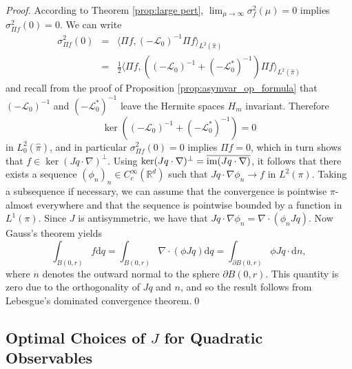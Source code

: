 \begin{proof}
	According to Theorem \ref{prop:large pert},  $\lim_{\mu\rightarrow\infty}\sigma_{f}^{2}(\mu)=0$  implies $\sigma_{\Pi f}^{2}(0)=0$. We can write 
	\begin{subequations}
	\begin{eqnarray}
	\sigma_{\Pi f}^{2}(0) & = & \langle \Pi f, (-\mathcal{L}_0)^{-1}\Pi f \rangle_{ L^{2}(\widehat{\pi})} \nonumber \\
	& = & \frac{1}{2}\langle \Pi f, \left((-\mathcal{L}_0)^{-1}+(-\mathcal{L}^{*}_0)^{-1}\right)\Pi f \rangle_{ L^{2}(\widehat{\pi})} \nonumber
	\end{eqnarray}
	\end{subequations}
	and recall from the proof of Proposition \ref{prop:asymvar_op_formula} that $(-\mathcal{L}_0)^{-1}$ and $(-\mathcal{L}^{*}_0)^{-1}$ leave the Hermite spaces $H_m$ invariant. Therefore  
	\begin{equation}
	\ker \left((-\mathcal{L}_0)^{-1}+(-\mathcal{L}^{*}_0)^{-1}\right) = {0}
	\end{equation}
	in $L^2_0(\widehat{\pi})$, and in particular $\sigma_{\Pi f}^{2}(0)=0$ implies $\Pi f = 0$, which in turn shows that
	  $f\in\ker(Jq\cdot\nabla)^{\perp}$. Using $\ker(Jq\cdot\nabla)^{\perp}=\overline{\operatorname{im}(Jq\cdot\nabla)}$,
	it follows that there exists a sequence $(\phi_n)_n\in C_c^{\infty}(\mathbb{R}^d)$ such that $Jq\cdot\nabla\phi_n \rightarrow f$ in $L^2(\pi)$. Taking a subsequence if necessary, we can assume that the convergence is pointwise $\pi$-almost everywhere and that the sequence is pointwise bounded by a function in $L^1(\pi)$. 
	Since $J$ is antisymmetric, we have that $Jq\cdot\nabla\phi_n=\nabla\cdot(\phi_n Jq)$.
	Now Gauss's theorem yields
	\[
	\int_{B(0,r)}f\mathrm{d}q=\int_{B(0,r)}\nabla\cdot(\phi Jq)\mathrm{d}q=\int_{\partial B(0,r)}\phi Jq\cdot\mathrm{d}n,
	\]
	where $n$ denotes
	the outward normal to the sphere $\partial B(0,r)$. This quantity
	is zero due to the orthogonality of $Jq$ and $n$, and so the result
	follows from Lebesgue's dominated convergence theorem.\qed
\end{proof}
\subsection{Optimal Choices of $J$ for Quadratic Observables}

